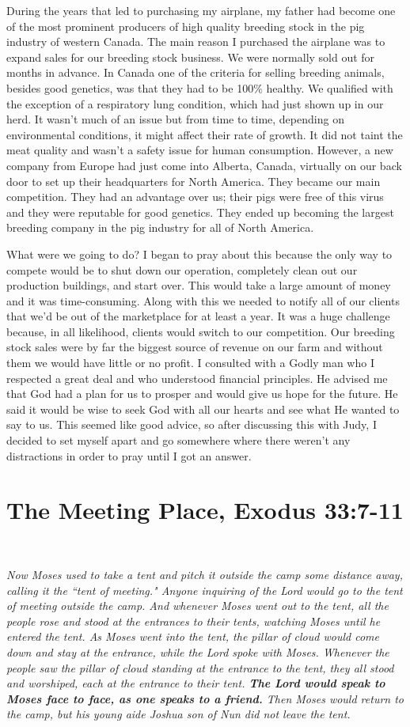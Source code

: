 \documentclass[oneside]{book}
\begin{document}
During the years that led to purchasing my airplane, my father had become one of the most prominent producers of high quality breeding stock in the pig industry of western Canada. The main reason I purchased the airplane was to expand sales for our breeding stock business. We were normally sold out for months in advance. In Canada one of the criteria for selling breeding animals, besides good genetics, was that they had to be 100\% healthy. We qualified with the exception of a respiratory lung condition, which had just shown up in our herd. It wasn't much of an issue but from time to time, depending on environmental conditions, it might affect their rate of growth. It did not taint the meat quality and wasn't a safety issue for human consumption. However, a new company from Europe had just come into Alberta, Canada, virtually on our back door to set up their headquarters for North America. They became our main competition. They had an advantage over us; their pigs were free of this virus and they were reputable for good genetics. They ended up becoming the largest breeding company in the pig industry for all of North America. 

What were we going to do? I began to pray about this because the only way to compete would be to shut down our operation, completely clean out our production buildings, and start over. This would take a large amount of money and it was time-consuming. Along with this we needed to notify all of our clients that we'd be out of the marketplace for at least a year. It was a huge challenge because, in all likelihood, clients would switch to our competition. Our breeding stock sales were by far the biggest source of revenue on our farm and without them we would have little or no profit. I consulted with a Godly man who I respected a great deal and who understood financial principles. He advised me that God had a plan for us to prosper and would give us hope for the future. He said it would be wise to seek God with all our hearts and see what He wanted to say to us. This seemed like good advice, so after discussing this with Judy, I decided to set myself apart and go somewhere where there weren't any distractions in order to pray until I got an answer.


\section{The Meeting Place, Exodus 33:7-11}
\

\textit{Now Moses used to take a tent and pitch it outside the camp some distance away, calling it the ``tent of meeting." Anyone inquiring of the Lord would go to the tent of meeting outside the camp. And whenever Moses went out to the tent, all the people rose and stood at the entrances to their tents, watching Moses until he entered the tent. As Moses went into the tent, the pillar of cloud would come down and stay at the entrance, while the Lord spoke with Moses. Whenever the people saw the pillar of cloud standing at the entrance to the tent, they all stood and worshiped, each at the entrance to their tent. \textbf{The Lord would speak to Moses face to face, as one speaks to a friend.} Then Moses would return to the camp, but his young aide Joshua son of Nun did not leave the tent.}
\end{document}
